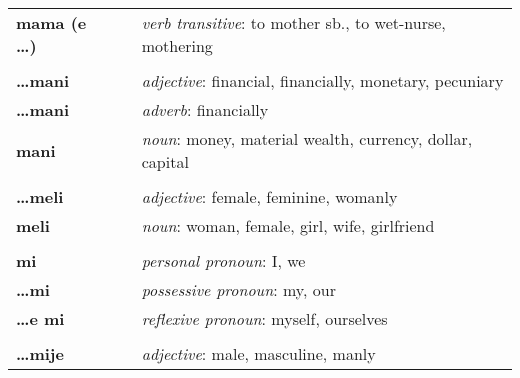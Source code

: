 \begin{supertabular}{p{2,5cm}|ll}
    \textbf{mama (e \dots)}      &  & \textit{verb transitive}: to mother sb., to wet-nurse, mothering                                           \\
                                 &  &                                                                                                            \\
    \textbf{\dots mani}          &  & \textit{adjective}: financial, financially, monetary, pecuniary                                            \\
    \textbf{\dots mani}          &  & \textit{adverb}: financially                                                                               \\
    \textbf{mani}                &  & \textit{noun}: money, material wealth, currency, dollar, capital                                           \\
                                 &  &                                                                                                            \\
    \textbf{\dots meli}          &  & \textit{adjective}: female, feminine, womanly                                                              \\
    \textbf{meli}                &  & \textit{noun}: woman, female, girl, wife, girlfriend                                                       \\
                                 &  &                                                                                                            \\
    \textbf{mi}                  &  & \textit{personal pronoun}: I, we                                                                           \\
    \textbf{\dots mi}            &  & \textit{possessive pronoun}: my, our                                                                       \\
    \textbf{\dots e mi}          &  & \textit{reflexive pronoun}: myself, ourselves                                                              \\
                                 &  &                                                                                                            \\
    \textbf{\dots mije}          &  & \textit{adjective}: male, masculine, manly                                                                 \\

\end{supertabular}

